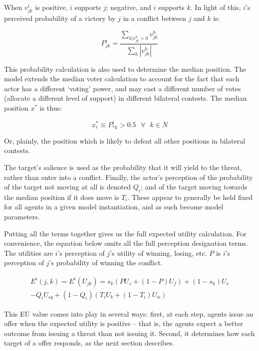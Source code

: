 When $v^{i}_{jk}$ is positive, $i$ supports $j$; negative, and $i$ supports $k$. In light of this, $i$'s perceived probability of a victory by $j$ in a conflict between $j$ and $k$ is:

\begin{equation}
P^i_{jk} = \frac{\sum\limits_{h|v^h_{jk}>0}v^h_{jk}}{\sum\limits_{h}|v^h_{jk}|} \label{eq:p_win}
\end{equation}

This probability calculation is also used to determine the median position. The model extends the \citet{black_1948} median voter calculation to account for the fact that each actor has a different `voting' power, and may cast a different number of votes (allocate a different level of support) in different bilateral contests. The median position $x^*$ is thus:

\begin{equation}
    x_i^* \equiv P^i_{*k} > 0.5 \text{ } \forall \text{ } k \in N
\end{equation}

Or, plainly, the position which is likely to defeat all other positions in bilateral contests.

The target's salience is used as the probability that it will yield to the threat, rather than enter into a conflict. Finally, the actor's perception of the probability of the target not moving at all is denoted $Q_i$; and of the target moving towards the median position if it does move is $T_i$. These appear to generally be held fixed for all agents in a given model instantiation, and as such become model parameters. 

Putting all the terms together gives us the full expected utility calculation. For convenience, the equation below omits all the full perception designation terms. The utilities are $i$'s perception of $j$'s utility of winning, losing, etc. $P$ is $i$'s perception of $j$'s probability of winning the conflict. 

\begin{equation}
    \label{eq:EU}
    \begin{split}
    E^i(j,k) = E^i(U_{jk}) = s_k (P U_s + (1-P)U_f) + (1 - s_k)U_s \\
    - Q_i U_{sq} + (1-Q_i)(T_iU_b + (1-T_i)U_w)
    \end{split}
\end{equation}

This EU value comes into play in several ways: first, at each step, agents issue an offer when the expected utility is positive -- that is, the agents expect a better outcome from issuing a threat than not issuing it. Second, it determines how each target of a offer responds, as the next section describes.


